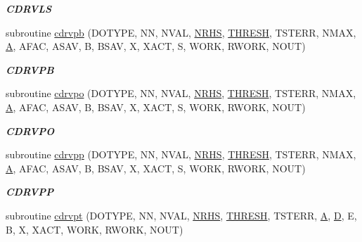 \begin{DoxyCompactItemize}
\begin{DoxyCompactList}\small\item\em {\bfseries C\+D\+R\+V\+L\+S} \end{DoxyCompactList}\item 
subroutine \hyperlink{group__complex__lin_gaaeaf7e26366e8d9591d8c6baa08a0fb1}{cdrvpb} (D\+O\+T\+Y\+P\+E, N\+N, N\+V\+A\+L, \hyperlink{example__user_8c_aa0138da002ce2a90360df2f521eb3198}{N\+R\+H\+S}, \hyperlink{zlaqgs_8c_a0656018abfc9fa2821827415f5d5ea57}{T\+H\+R\+E\+S\+H}, T\+S\+T\+E\+R\+R, N\+M\+A\+X, \hyperlink{classA}{A}, A\+F\+A\+C, A\+S\+A\+V, B, B\+S\+A\+V, X, X\+A\+C\+T, S, W\+O\+R\+K, R\+W\+O\+R\+K, N\+O\+U\+T)
\begin{DoxyCompactList}\small\item\em {\bfseries C\+D\+R\+V\+P\+B} \end{DoxyCompactList}\item 
subroutine \hyperlink{group__complex__lin_ga53331dba1409d03a19084ce082821c99}{cdrvpo} (D\+O\+T\+Y\+P\+E, N\+N, N\+V\+A\+L, \hyperlink{example__user_8c_aa0138da002ce2a90360df2f521eb3198}{N\+R\+H\+S}, \hyperlink{zlaqgs_8c_a0656018abfc9fa2821827415f5d5ea57}{T\+H\+R\+E\+S\+H}, T\+S\+T\+E\+R\+R, N\+M\+A\+X, \hyperlink{classA}{A}, A\+F\+A\+C, A\+S\+A\+V, B, B\+S\+A\+V, X, X\+A\+C\+T, S, W\+O\+R\+K, R\+W\+O\+R\+K, N\+O\+U\+T)
\begin{DoxyCompactList}\small\item\em {\bfseries C\+D\+R\+V\+P\+O} \end{DoxyCompactList}\item 
subroutine \hyperlink{group__complex__lin_gaf24e28fbb80d290b1340a03f4799377c}{cdrvpp} (D\+O\+T\+Y\+P\+E, N\+N, N\+V\+A\+L, \hyperlink{example__user_8c_aa0138da002ce2a90360df2f521eb3198}{N\+R\+H\+S}, \hyperlink{zlaqgs_8c_a0656018abfc9fa2821827415f5d5ea57}{T\+H\+R\+E\+S\+H}, T\+S\+T\+E\+R\+R, N\+M\+A\+X, \hyperlink{classA}{A}, A\+F\+A\+C, A\+S\+A\+V, B, B\+S\+A\+V, X, X\+A\+C\+T, S, W\+O\+R\+K, R\+W\+O\+R\+K, N\+O\+U\+T)
\begin{DoxyCompactList}\small\item\em {\bfseries C\+D\+R\+V\+P\+P} \end{DoxyCompactList}\item 
subroutine \hyperlink{group__complex__lin_gab3b93dec6fb0c808a7b753ffe12d84ba}{cdrvpt} (D\+O\+T\+Y\+P\+E, N\+N, N\+V\+A\+L, \hyperlink{example__user_8c_aa0138da002ce2a90360df2f521eb3198}{N\+R\+H\+S}, \hyperlink{zlaqgs_8c_a0656018abfc9fa2821827415f5d5ea57}{T\+H\+R\+E\+S\+H}, T\+S\+T\+E\+R\+R, \hyperlink{classA}{A}, \hyperlink{odrpack_8h_a7dae6ea403d00f3687f24a874e67d139}{D}, E, B, X, X\+A\+C\+T, W\+O\+R\+K, R\+W\+O\+R\+K, N\+O\+U\+T)

\end{DoxyCompactItemize}

